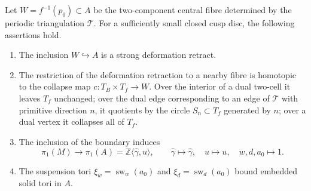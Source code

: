 \begin{lemma}\label{lem:cusp-retraction}
Let $W=f^{-1}(p_0)\subset A$ be the two-component central fibre determined
by the periodic triangulation $\mathcal T$.  For
a sufficiently small closed cusp disc, the following assertions hold.
\begin{enumerate}
\item The inclusion $W\hookrightarrow A$ is a strong deformation
retract.
\item The restriction of the deformation retraction to a nearby fibre is
homotopic to the collapse map
$c:T_B\times T_f\to W$.
Over the interior of a dual two-cell it leaves $T_f$ unchanged; over the
dual edge corresponding to an edge of $\mathcal T$ with primitive
direction $n$, it quotients by the circle $S_n\subset T_f$ generated by
$n$; over a dual vertex it collapses all of $T_f$.
\item The inclusion of the boundary induces
\begin{equation}\label{eq:cusp-pi1-map}
 \pi_1(M)\longrightarrow\pi_1(A)=\mathbb Z\langle \widehat\gamma,u\rangle,
 \qquad
 \widehat\gamma\mapsto\widehat\gamma,\quad
 u\mapsto u,\quad w,d,a_0\mapsto1.
\end{equation}
\item The suspension tori $\xi_w=\operatorname{sw}_{w}(a_0)$ and
$\xi_d=\operatorname{sw}_{d}(a_0)$
bound embedded solid tori in $A$.
\end{enumerate}
\end{lemma}

